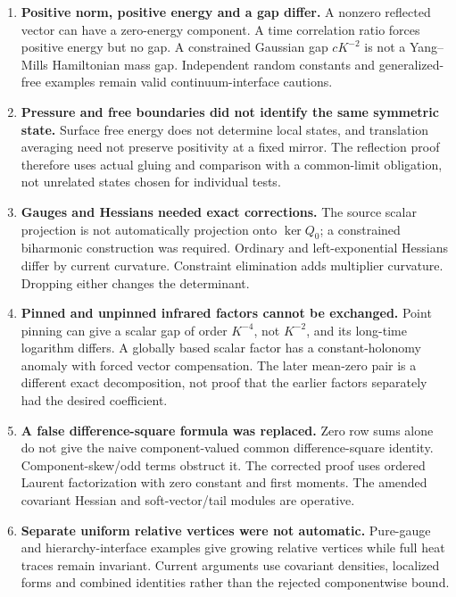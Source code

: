 \begin{enumerate}
\item \textbf{Positive norm, positive
energy and a gap differ.}
A nonzero reflected vector can have
a zero-energy component. A time
correlation ratio forces positive
energy but no gap. A constrained
Gaussian gap \(cK^{-2}\) is not a
Yang--Mills Hamiltonian mass gap.
Independent random constants and
generalized-free examples remain
valid continuum-interface cautions.

\item \textbf{Pressure and free
boundaries did not identify the
same symmetric state.}
Surface free energy does not determine
local states, and translation averaging
need not preserve positivity at a
fixed mirror. The reflection proof
therefore uses actual gluing and
comparison with a common-limit
obligation, not unrelated states
chosen for individual tests.

\item \textbf{Gauges and Hessians
needed exact corrections.}
The source scalar projection is not
automatically projection onto
\(\ker Q_0\); a constrained biharmonic
construction was required.
Ordinary and left-exponential
Hessians differ by current curvature.
Constraint elimination adds multiplier
curvature. Dropping either changes
the determinant.

\item \textbf{Pinned and unpinned
infrared factors cannot be exchanged.}
Point pinning can give a scalar gap
of order \(K^{-4}\), not \(K^{-2}\),
and its long-time logarithm differs.
A globally based scalar factor has
a constant-holonomy anomaly with
forced vector compensation.
The later mean-zero pair is a
different exact decomposition, not
proof that the earlier factors
separately had the desired coefficient.

\item \textbf{A false difference-square
formula was replaced.}
Zero row sums alone do not give
the naive component-valued common
difference-square identity.
Component-skew/odd terms obstruct it.
The corrected proof uses ordered
Laurent factorization with zero
constant and first moments.
The amended covariant Hessian and
soft-vector/tail modules are operative.

\item \textbf{Separate uniform
relative vertices were not automatic.}
Pure-gauge and hierarchy-interface
examples give growing relative
vertices while full heat traces
remain invariant. Current arguments
use covariant densities, localized
forms and combined identities rather
than the rejected componentwise bound.


\end{enumerate}
